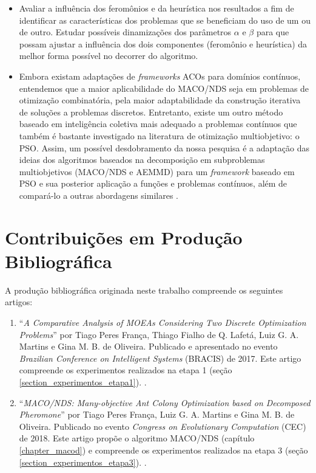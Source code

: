 \begin{itemize}
	\item Avaliar a influência dos feromônios e da heurística nos resultados a fim de identificar as características dos problemas que se beneficiam do uso de um ou de outro. Estudar possíveis dinamizações dos parâmetros $\alpha$ e $\beta$ para que possam ajustar a influência dos dois componentes (feromônio e heurística) da melhor forma possível no decorrer do algoritmo.
	
	\item Embora existam adaptações de \textit{frameworks} ACOs para domínios contínuos, entendemos que a maior aplicabilidade do MACO/NDS seja em problemas de otimização combinatória, pela maior adaptabilidade da construção iterativa de soluções a problemas discretos. Entretanto, existe um outro método baseado em inteligência coletiva mais adequado a problemas contínuos que também é bastante investigado na literatura de otimização multiobjetivo: o PSO. Assim, um possível desdobramento da nossa pesquisa é a adaptação das ideias dos algoritmos baseados na decomposição em subproblemas multiobjetivos (MACO/NDS e AEMMD) para um \textit{framework} baseado em PSO e sua posterior aplicação a funções e problemas contínuos, além de compará-lo a outras abordagens similares \cite{Freire2017}.
\end{itemize}

\section{Contribuições em Produção Bibliográfica}
A produção bibliográfica originada neste trabalho compreende os seguintes artigos:

\begin{enumerate}
	\item ``\textit{A Comparative Analysis of MOEAs Considering Two Discrete Optimization Problems}'' por Tiago Peres França, Thiago Fialho de Q. Lafetá, Luiz G. A. Martins e Gina M. B. de Oliveira. Publicado e apresentado no evento \textit{Brazilian Conference on Intelligent Systems} (BRACIS) de 2017. Este artigo compreende os experimentos realizados na etapa 1 (seção \ref{section_experimentos_etapa1}). \cite{Franca2017}.
	\item ``\textit{MACO/NDS: Many-objective Ant Colony Optimization based on Decomposed
		Pheromone}'' por Tiago Peres França, Luiz G. A. Martins e Gina M. B. de Oliveira. Publicado no evento \textit{Congress on Evolutionary Computation} (CEC) de 2018. Este artigo propõe o algoritmo MACO/NDS (capítulo \ref{chapter_macod}) e compreende os experimentos realizados na etapa 3 (seção \ref{section_experimentos_etapa3}). \cite{Franca2018}.
\end{enumerate}